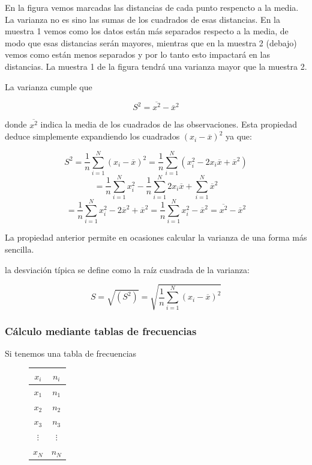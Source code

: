 \documentclass[]{article}
\theoremstyle{plain}
\theoremstyle{definition}
\theoremstyle{definition} %
\begin{document}
En la figura vemos marcadas las distancias de cada punto respencto a la
media. La varianza no es sino las sumas de los cuadrados de esas
distancias. En la muestra 1 vemos como los datos están más separados
respecto a la media, de modo que esas distancias serán mayores, mientras
que en la muestra 2 (debajo) vemos como están menos separados y por lo
tanto esto impactará en las distancias. La muestra 1 de la figura tendrá
una varianza mayor que la muestra 2.

La varianza cumple que

\[S^2 = \overline{x^2} - \overline x^2\]

donde \(\overline{x^2}\) indica la media de los cuadrados de las
observaciones. Esta propiedad deduce simplemente expandiendo los
cuadrados \((x_i - \overline x)^2\) ya que:

\[S^2 = \frac{1}{n}\sum^N_{i=1} (x_i - \overline x)^2 = \frac{1}{n}\sum^N_{i=1} (x^2_i - 2x_i \overline x + \overline x^2)\]
\[=\frac{1}{n}\sum^N_{i=1} x_i^2 - \frac{1}{n}\sum^N_{i=1}2 x_i \overline x + \sum^N_{i=1}\overline x^2\]
\[=\frac{1}{n}\sum^N_{i=1} x_i^2 - 2 \overline x^2 + \overline x^2 = \frac{1}{n}\sum^N_{i=1} x_i^2 - \overline x^2 = \overline{x^2} - \overline x^2\]

La propiedad anterior permite en ocasiones calcular la varianza de una
forma más sencilla.

la desviación típica se define como la raíz cuadrada de la varianza:

\[S = \sqrt{(S^2)} = \sqrt{\frac{1}{n}\sum^N_{i=1} (x_i - \overline x)^2}\]

\hypertarget{cuxe1lculo-mediante-tablas-de-frecuencias}{%
\subsubsection{Cálculo mediante tablas de
frecuencias}\label{cuxe1lculo-mediante-tablas-de-frecuencias}}

Si tenemos una tabla de frecuencias

\begin{figure}
  \centering
\begin{tabular}{cc}
\(x_i\) & \(n_i\)\\
\hline
\(x_1\) & \(n_1\)      \\
\(x_2\) & \(n_2\)      \\
\(x_3\) & \(n_3\)      \\
\(\vdots\) & \(\vdots\)\\
\(x_N\) & \(n_N\)
\end{tabular}
\end{figure}
\end{document}
